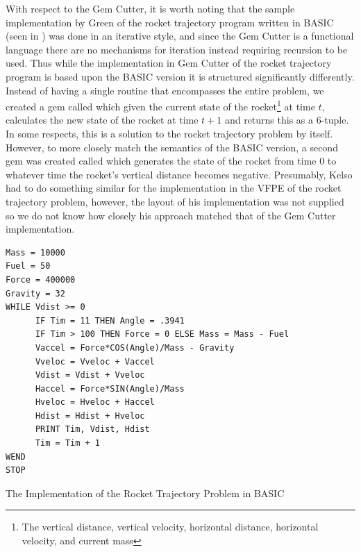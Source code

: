 With respect to the Gem Cutter, it is worth noting that the sample implementation by Green of the rocket trajectory program written in BASIC (seen in ) was done in an iterative style, and since the Gem Cutter is a functional language there are no mechanisms for iteration instead requiring recursion to be used.  Thus while the implementation in Gem Cutter of the rocket trajectory program is based upon the BASIC version it is structured significantly differently.  Instead of having a single routine that encompasses the entire problem, we created a gem called  which given the current state of the rocket\footnote{The vertical distance, vertical velocity, horizontal distance, horizontal velocity, and current mass} at time $t$, calculates the new state of the rocket at time $t + 1$ and returns this as a 6-tuple.  In some respects, this is a solution to the rocket trajectory problem by itself.  However, to more closely match the semantics of the BASIC version, a second gem was created called  which generates the state of the rocket from time 0 to whatever time the rocket's vertical distance becomes negative.  Presumably, Kelso had to do something similar for the implementation in the VFPE of the rocket trajectory problem, however, the layout of his implementation was not supplied so we do not know how closely his approach matched that of the Gem Cutter implementation.

\begin{program}
\begin{verbatim}
Mass = 10000
Fuel = 50
Force = 400000
Gravity = 32
WHILE Vdist >= 0
      IF Tim = 11 THEN Angle = .3941
      IF Tim > 100 THEN Force = 0 ELSE Mass = Mass - Fuel
      Vaccel = Force*COS(Angle)/Mass - Gravity
      Vveloc = Vveloc + Vaccel
      Vdist = Vdist + Vveloc
      Haccel = Force*SIN(Angle)/Mass
      Hveloc = Hveloc + Haccel
      Hdist = Hdist + Hveloc
      PRINT Tim, Vdist, Hdist
      Tim = Tim + 1
WEND
STOP
\end{verbatim}
\caption{The Implementation of the Rocket Trajectory Problem in BASIC\cite{green96}}
\label{prog:basicRocket1}
\end{program}

